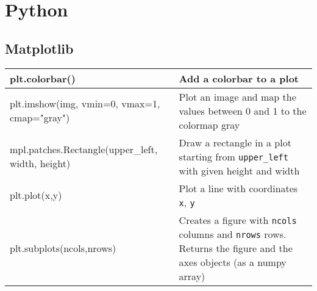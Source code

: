 \section{Python}
\small
\renewcommand{\arraystretch}{1.1}
\subsection{Matplotlib}
\begin{tabularx}{\textwidth}{t{8cm} X}
    \hline
    plt.colorbar()                                    & Add a colorbar to a plot                                                                                                         \\\hline
    plt.imshow(img, vmin=0, vmax=1, cmap="gray")      & Plot an image and map the values between 0 and 1 to the colormap gray                                                            \\\hline
    mpl.patches.Rectangle(upper\_left, width, height) & Draw a rectangle in a plot starting from \texttt{upper\_left} with given height and width                                        \\\hline
    plt.plot(x,y)                                     & Plot a line with coordinates \texttt{x}, \texttt{y}                                                                              \\\hline
    plt.subplots(ncols,nrows)                         & Creates a figure with \texttt{ncols} columns and \texttt{nrows} rows. Returns the figure and the axes objects (as a numpy array) \\\hline
\end{tabularx}

